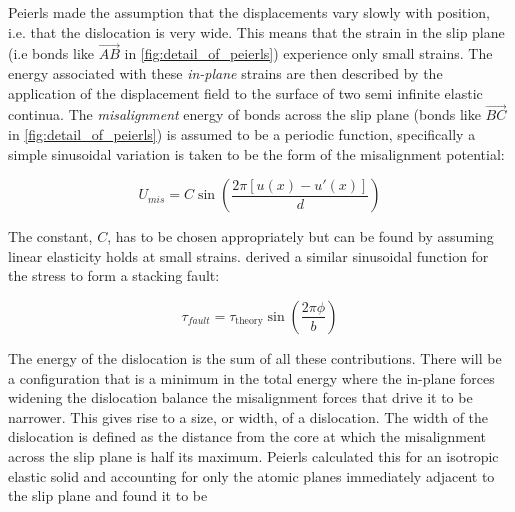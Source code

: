 Peierls made the assumption that the displacements vary slowly with position, i.e. that the dislocation is very wide. This means that the strain in the slip plane (i.e bonds like $\overrightarrow{AB}$ in \autoref{fig:detail_of_peierls}) experience only small strains. The energy associated with these \emph{in-plane} strains are then described  by the application of the displacement field to the surface of two semi infinite elastic continua. 
The \emph{misalignment} energy of bonds across the slip plane (bonds like $\overrightarrow{BC}$ in \autoref{fig:detail_of_peierls}) is assumed to be a periodic function, specifically a simple sinusoidal variation is taken to be the form of the misalignment potential:

\begin{equation}
U_{mis} = C \sin \left(\frac{2\pi [u(x) - u'(x)]}{d} \right) \label{eqn:Frenkel_approx}
\end{equation}















%
%
%
%
%
%
%
%
%
%





The constant, $C$, has to be chosen appropriately but can be found by assuming linear elasticity holds at small strains. \citet{Frenkel1926} derived a similar sinusoidal function for the stress to form a stacking fault:










\begin{equation}
\tau_{fault} = \tau_{\text{theory}} \sin \left( \frac{2\pi \phi}{b} \right)
\end{equation}

The energy of the dislocation is the sum of all these contributions. There will be a configuration that is a minimum in the total energy where the in-plane forces widening the dislocation balance the misalignment forces that drive it to be narrower. This gives rise to a size, or width, of a dislocation. The width of the dislocation is defined as the distance from the core at which the misalignment across the slip plane is half its maximum. Peierls calculated this for an isotropic elastic solid and accounting for only the atomic planes immediately adjacent to the slip plane and found it to be 

